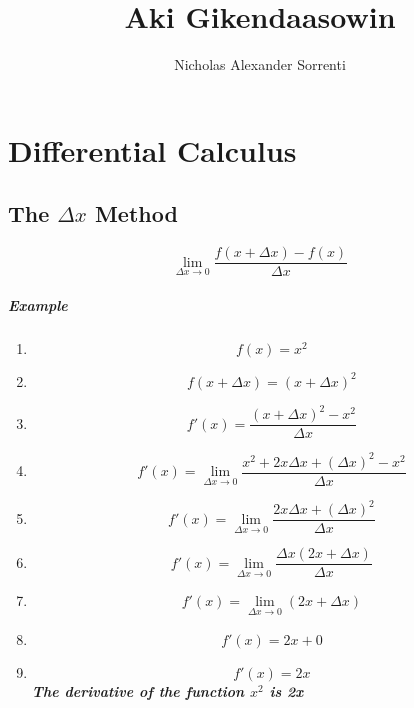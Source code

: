 \documentclass[a4paper,11pt]{book}
\title{Aki Gikendaasowin}
\author{Nicholas Alexander Sorrenti}
\begin{document}
\maketitle
\tableofcontents

\chapter{Differential Calculus}
\section{The $ \Delta x $ Method}
\LARGE 
\[ \lim_{\Delta x \to 0} \frac{f(x + \Delta x) - f(x)}{\Delta x} \]

\paragraph{Example}
\begin{enumerate}
  \item \[ f(x) = x^2 \]
  \item \[ f(x + \Delta x) = (x + \Delta x)^2 \]
  \item \[ f'(x) = \frac{(x + \Delta x)^2 - x^2}{\Delta x} \]
  \item \[ f'(x) = \lim_{\Delta x \to 0} \frac{x^2 + 2x\Delta x + (\Delta x)^2 - x^2}{\Delta x} \]
  \item \[ f'(x) = \lim_{\Delta x \to 0} \frac{2x\Delta x + (\Delta x)^2}{\Delta x} \]
  \item \[ f'(x) = \lim_{\Delta x \to 0} \frac{\Delta x (2x +\Delta x)}{\Delta x} \]  
  \item \[ f'(x) = \lim_{\Delta x \to 0} (2x +\Delta x) \]
  \item \[ f'(x) = 2x + 0 \]
  \item \[ f'(x) = 2x \]
  \large 
  \textit{\textbf{The derivative of the function $ x^2 $ is 2x}}
\end{enumerate}
\end{document}
